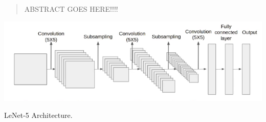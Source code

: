 \documentclass[manuscript,screen,review]{acmart}
\newcommand{\commentt}[1]{}
\begin{document}
\begin{abstract}
  ABSTRACT GOES HERE!!!!
\end{abstract}

\commentt{ %
\begin{CCSXML}
<ccs2012>
 <concept>
  <concept_id>10010520.10010553.10010562</concept_id>
  <concept_desc>Computer systems organization~Embedded systems</concept_desc>
  <concept_significance>500</concept_significance>
 </concept>
 <concept>
  <concept_id>10010520.10010575.10010755</concept_id>
  <concept_desc>Computer systems organization~Redundancy</concept_desc>
  <concept_significance>300</concept_significance>
 </concept>
 <concept>
  <concept_id>10010520.10010553.10010554</concept_id>
  <concept_desc>Computer systems organization~Robotics</concept_desc>
  <concept_significance>100</concept_significance>
 </concept>
 <concept>
  <concept_id>10003033.10003083.10003095</concept_id>
  <concept_desc>Networks~Network reliability</concept_desc>
  <concept_significance>100</concept_significance>
 </concept>
</ccs2012>
\end{CCSXML}

\ccsdesc[500]{Computer systems organization~Embedded systems}
\ccsdesc[300]{Computer systems organization~Redundancy}
\ccsdesc{Computer systems organization~Robotics}
\ccsdesc[100]{Networks~Network reliability}
} %


\begin{teaserfigure}
  \includegraphics[width=\textwidth]{../presentation/lenet5.png}
  \caption{LeNet-5 Architecture.}
  \label{fig:teaser}
\end{teaserfigure}
\end{document}
